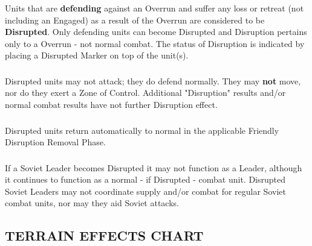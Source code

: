 \subsubsection{} Units that are \textbf{defending} against an Overrun and suffer any loss or retreat (not including an Engaged) as a result of the Overrun are considered to be \textbf{Disrupted}. Only defending units can become Disrupted and Disruption pertains only to a Overrun - not normal combat. The status of Disruption is indicated by placing a Disrupted Marker on top of the unit(s).

\subsubsection{} Disrupted units may not attack; they do defend normally. They may \textbf{not} move, nor do they exert a Zone of Control. Additional "Disruption" results and/or normal combat results have not further Disruption effect.

\subsubsection{} Disrupted units return automatically to normal in the applicable Friendly Disruption Removal Phase.

\subsubsection{} If a Soviet Leader becomes Disrupted it may not function as a Leader, although it continues to function as a normal - if Disrupted - combat unit. Disrupted Soviet Leaders may not coordinate supply and/or combat for regular Soviet combat units, nor may they aid Soviet attacks.

\subsection{TERRAIN EFFECTS CHART}
